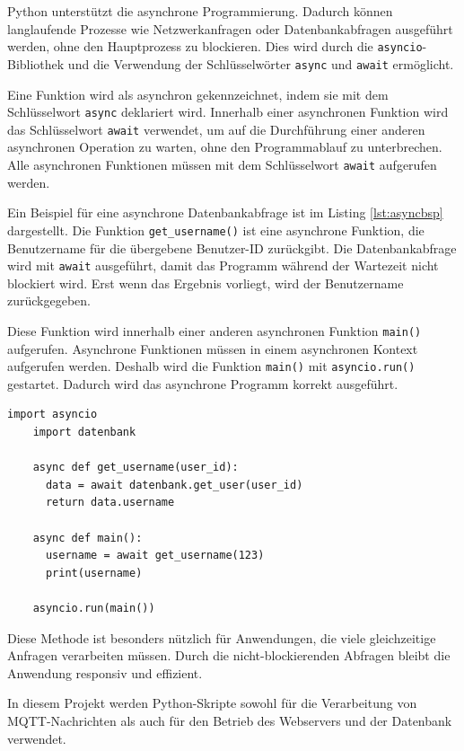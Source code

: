 \documentclass[12pt, letterpaper]{article}
\begin{document}
  \par Python unterstützt die asynchrone Programmierung. Dadurch können langlaufende Prozesse wie Netzwerkanfragen oder Datenbankabfragen ausgeführt werden, ohne den Hauptprozess zu blockieren. Dies wird durch die \texttt{asyncio}-Bibliothek und die Verwendung der Schlüsselwörter \texttt{async} und \texttt{await} ermöglicht.  
  \par Eine Funktion wird als asynchron gekennzeichnet, indem sie mit dem Schlüsselwort \texttt{async} deklariert wird. Innerhalb einer asynchronen Funktion wird das Schlüsselwort \texttt{await} verwendet, um auf die Durchführung einer anderen asynchronen Operation zu warten, ohne den Programmablauf zu unterbrechen. Alle asynchronen Funktionen müssen mit dem Schlüsselwort \texttt{await} aufgerufen werden.
  \par Ein Beispiel für eine asynchrone Datenbankabfrage ist im Listing \ref{lst:asyncbsp} dargestellt. Die Funktion \texttt{get\_username()} ist eine asynchrone Funktion, die Benutzername für die übergebene Benutzer-ID zurückgibt. Die Datenbankabfrage wird mit \texttt{await} ausgeführt, damit das Programm während der Wartezeit nicht blockiert wird. Erst wenn das Ergebnis vorliegt, wird der Benutzername zurückgegeben.  
  \par Diese Funktion wird innerhalb einer anderen asynchronen Funktion \texttt{main()} aufgerufen. Asynchrone Funktionen müssen in einem asynchronen Kontext aufgerufen werden. Deshalb wird die Funktion \texttt{main()} mit \texttt{asyncio.run()} gestartet. Dadurch wird das asynchrone Programm korrekt ausgeführt.
  \begin{lstlisting}[style=mypython, label={lst:asyncbsp}, caption={Beispiel für asynchrone Abfrage}]
    import asyncio
    import datenbank

    async def get_username(user_id):
      data = await datenbank.get_user(user_id)
      return data.username

    async def main():
      username = await get_username(123)
      print(username)
  
    asyncio.run(main())

  \end{lstlisting} 
  \par Diese Methode ist besonders nützlich für Anwendungen, die viele gleichzeitige Anfragen verarbeiten müssen. Durch die nicht-blockierenden Abfragen bleibt die Anwendung responsiv und effizient. 
  \par In diesem Projekt werden Python-Skripte sowohl für die Verarbeitung von MQTT-Nachrichten als auch für den Betrieb des Webservers und der Datenbank verwendet.
\end{document}
